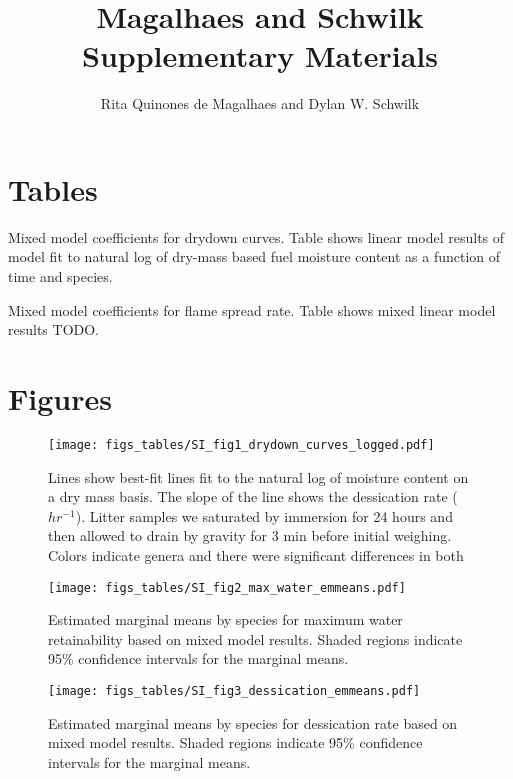 \documentclass[letterpaper]{article}
\title{Magalhaes and Schwilk Supplementary Materials}
\author{Rita Quinones de Magalhaes and Dylan W. Schwilk}
\begin{document}
\maketitle

\section{Tables}

\begin{table}[h]
  \caption{Mixed model coefficients for drydown curves. Table shows linear model results of model fit to  natural log of dry-mass based fuel moisture content as a function of time and species.} 
  \label{tabS1}
\centering

\end{table}

\begin{table}[h]
  \caption{Mixed model coefficients for flame spread rate. Table shows mixed linear model results  TODO.} 
  \label{tabS3}
\centering

\end{table}

\section{Figures}


\begin{figure}[H]
  \centering
  \texttt{[image: figs\_tables/SI\_fig1\_drydown\_curves\_logged.pdf]}
   \label{SI_fig1}
\caption[Semi-log scale dry down curves for eight litter types.]{Lines show best-fit lines fit to the natural log of moisture content on a dry mass basis.  The slope of the line shows the dessication rate ($hr^{-1}$). Litter samples we saturated by immersion for 24 hours and then allowed to drain by gravity for 3 min before initial weighing. Colors indicate genera and there were significant differences in both }

\end{figure}



\begin{figure}[h]
  \centering
  \label{SI_fig2}
  \texttt{[image: figs\_tables/SI\_fig2\_max\_water\_emmeans.pdf]}
\caption{Estimated marginal means by species for maximum water retainability based on mixed model results. Shaded regions indicate 95\% confidence intervals for the marginal means.}
\end{figure}


\begin{figure}[h]
  \centering
  \label{fig-S2}
\texttt{[image: figs\_tables/SI\_fig3\_dessication\_emmeans.pdf]}
\caption{Estimated marginal means by species for dessication rate based on mixed model results. Shaded regions indicate 95\% confidence intervals for the marginal means.}
\end{figure}
\end{document}
